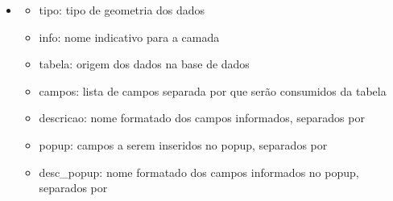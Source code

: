 \documentclass[letterpaper,10pt,brazil]{sphinxmanual}
\begin{document}
\begin{sphinxVerbatim}[commandchars=\\\{\}]
\end{sphinxVerbatim}
\begin{itemize}
\item {} \begin{description}
\begin{itemize}
\item {} 
\sphinxAtStartPar
tipo: tipo de geometria dos dados

\item {} 
\sphinxAtStartPar
info: nome indicativo para a camada

\item {} 
\sphinxAtStartPar
tabela: origem dos dados na base de dados

\item {} 
\sphinxAtStartPar
campos: lista de campos separada por \sphinxcode{\sphinxupquote{\#}} que serão consumidos da tabela

\item {} 
\sphinxAtStartPar
descricao: nome formatado dos campos informados, separados por \sphinxcode{\sphinxupquote{\#}}

\item {} 
\sphinxAtStartPar
popup: campos a serem inseridos no popup, separados por \sphinxcode{\sphinxupquote{\#}}

\item {} 
\sphinxAtStartPar
desc\_popup: nome formatado dos campos informados no popup, separados por \sphinxcode{\sphinxupquote{\#}}

\end{itemize}

\end{description}

\end{itemize}
\end{document}
